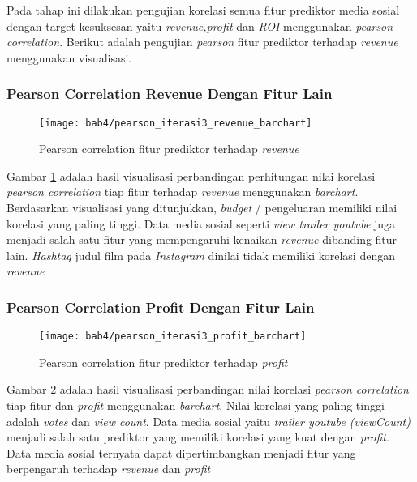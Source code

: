 Pada tahap ini dilakukan pengujian korelasi semua fitur prediktor media sosial dengan target kesuksesan yaitu \textit{revenue,profit} dan \textit{ROI} menggunakan \textit{pearson correlation}. Berikut adalah pengujian \textit{pearson} fitur prediktor terhadap \textit{revenue} menggunakan visualisasi. 

\subsubsection{Pearson Correlation Revenue Dengan Fitur Lain}

\begin{figure}[H]
	\centering  
	\texttt{[image: bab4/pearson\_iterasi3\_revenue\_barchart]}   
	\caption{Pearson correlation fitur prediktor terhadap \textit{revenue}}	\label{fig:pearson_iterasi3_revenue_barchart} 
\end{figure}


Gambar \ref{fig:pearson_iterasi3_revenue_barchart} adalah hasil visualisasi perbandingan perhitungan nilai korelasi \textit{pearson correlation} tiap fitur terhadap \textit{revenue} menggunakan \textit{barchart}. Berdasarkan visualisasi yang ditunjukkan, \textit{budget} / pengeluaran memiliki nilai korelasi yang paling tinggi. Data media sosial seperti \textit{view trailer youtube} juga menjadi salah satu fitur yang mempengaruhi kenaikan \textit{revenue} dibanding fitur lain. \textit{Hashtag} judul film pada \textit{Instagram} dinilai tidak memiliki korelasi dengan \textit{revenue} 

\subsubsection{Pearson Correlation Profit Dengan Fitur Lain}

\begin{figure}[H]
	\centering  
	\texttt{[image: bab4/pearson\_iterasi3\_profit\_barchart]}   
	\caption{Pearson correlation fitur prediktor terhadap \textit{profit}}	\label{fig:pearson_iterasi3_profit_barchart} 
\end{figure}


Gambar \ref{fig:pearson_iterasi3_profit_barchart} adalah hasil visualisasi perbandingan nilai korelasi \textit{pearson correlation} tiap fitur dan \textit{profit} menggunakan \textit{barchart}. Nilai korelasi yang paling tinggi adalah \textit{votes} dan \textit{view count}. Data media sosial yaitu \textit{trailer youtube (viewCount)} menjadi salah satu prediktor yang memiliki korelasi yang kuat dengan \textit{profit}. Data media sosial ternyata dapat dipertimbangkan menjadi fitur yang berpengaruh terhadap \textit{revenue} dan \textit{profit}


